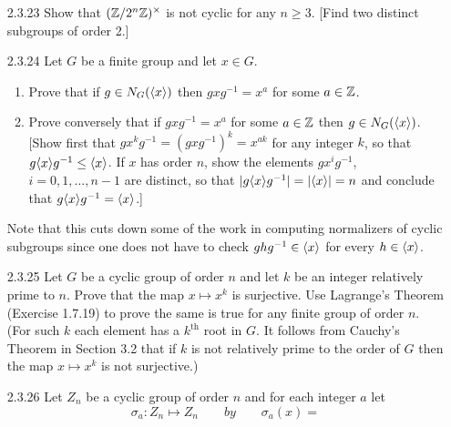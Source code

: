 \begin{enumerate}
   \item[2.3.23]  Show that $(\mathbb{Z}/2^n\mathbb{Z})^\times$ is not cyclic for any $n \ge 3$.
                  [Find two distinct subgroups of order 2.]
   \item[2.3.24]  Let $G$ be a finite group and let $x \in G$.
                  \begin{enumerate}
                     \item Prove that if $g \in N_G(\langle x \rangle)$ then
                           $gxg^{-1} = x^a$ for some $a \in \mathbb{Z}$. 
                     \item Prove conversely that if $gxg^{-1} = x^a$ for some
                           $a \in \mathbb{Z}$ then $g \in N_G(\langle x \rangle)$. [Show first
                           that $gx^kg^{-1} = (gxg^{-1})^k = x^{ak}$ for any
                           integer $k$, so that $g\langle x \rangle g^{-1} \le \langle x \rangle$.
                           If $x$ has order $n$, show the elements $gx^ig^{-1}$,
                           $i = 0, 1, \ldots, n-1$ are distinct, so that
                           $|g\langle x \rangle g^{-1}| = |\langle x \rangle| = n$ and conclude that
                           $g\langle x \rangle g^{-1} = \langle x \rangle$.]
                  \end{enumerate}
                  Note that this cuts down some of the work in computing
                  normalizers of cyclic subgroups since one does not have to
                  check $ghg^{-1} \in \langle x \rangle$ for every $h \in \langle x \rangle$.
   \item[2.3.25]  Let $G$ be a cyclic group of order $n$ and let $k$ be an
                  integer relatively prime to $n$. Prove that the map
                  $x \mapsto x^k$ is surjective. Use Lagrange's Theorem
                  (Exercise 1.7.19) to prove the same is true for any finite
                  group of order $n$. (For such $k$ each element has a
                  $k^{\text{th}}$ root in $G$. It follows from Cauchy's Theorem
                  in Section 3.2 that if $k$ is not relatively prime to the
                  order of $G$ then the map $x \mapsto x^k$ is not surjective.)
   \item[2.3.26]  Let $Z_n$ be a cyclic group of order $n$ and for each integer
                  $a$ let
                  $$\sigma_a : Z_n \mapsto Z_n \qquad by \qquad \sigma_a(x) =
$$
\end{enumerate}

